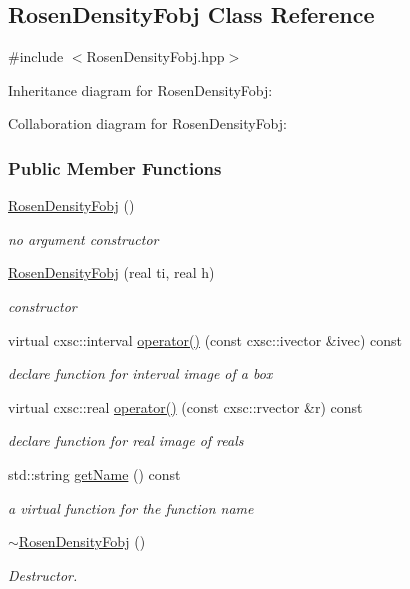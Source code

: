 \hypertarget{classRosenDensityFobj}{\subsection{\-Rosen\-Density\-Fobj \-Class \-Reference}
\label{classRosenDensityFobj}
}


{\ttfamily \#include $<$\-Rosen\-Density\-Fobj.\-hpp$>$}



\-Inheritance diagram for \-Rosen\-Density\-Fobj\-:


\-Collaboration diagram for \-Rosen\-Density\-Fobj\-:
\subsubsection*{\-Public \-Member \-Functions}
\begin{DoxyCompactItemize}
\item 
\hyperlink{classRosenDensityFobj_add387cdd9b69b03274a28cb74fc4e6c5}{\-Rosen\-Density\-Fobj} ()
\begin{DoxyCompactList}\small\item\em no argument constructor \end{DoxyCompactList}\item 
\hyperlink{classRosenDensityFobj_a93f28152158f39add7f42b334e16bf3f}{\-Rosen\-Density\-Fobj} (real ti, real h)
\begin{DoxyCompactList}\small\item\em constructor \end{DoxyCompactList}\item 
virtual cxsc\-::interval \hyperlink{classRosenDensityFobj_a8895f069880101743b15ca3b452bb777}{operator()} (const cxsc\-::ivector \&ivec) const 
\begin{DoxyCompactList}\small\item\em declare function for interval image of a box \end{DoxyCompactList}\item 
virtual cxsc\-::real \hyperlink{classRosenDensityFobj_afbc72b00926e0b6c9ad073bbb4823aba}{operator()} (const cxsc\-::rvector \&r) const 
\begin{DoxyCompactList}\small\item\em declare function for real image of reals \end{DoxyCompactList}\item 
std\-::string \hyperlink{classRosenDensityFobj_a292e8edb10388e7238ca728291889cee}{get\-Name} () const 
\begin{DoxyCompactList}\small\item\em a virtual function for the function name \end{DoxyCompactList}\item 
\hyperlink{classRosenDensityFobj_aad064f3b16c4c747ad690eeabb75984d}{$\sim$\-Rosen\-Density\-Fobj} ()
\begin{DoxyCompactList}\small\item\em \-Destructor. \end{DoxyCompactList}\end{DoxyCompactItemize}

